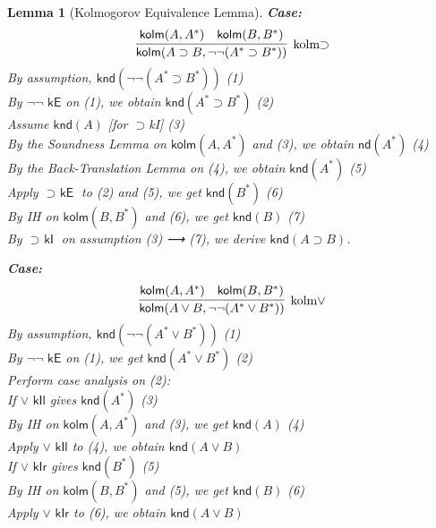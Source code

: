 \documentclass{article}
\newtheorem{lemma}{Lemma}
\begin{document}
\begin{lemma}[Kolmogorov Equivalence Lemma]
    \noindent \textbf{Case:} 
    \[
    \infer[\text{kolm$\supset$}]{\textsf{kolm}(A \supset B, \neg\neg (A^* \supset B^*))}{
      \textsf{kolm}(A, A^*) \quad \textsf{kolm}(B, B^*)
    }
    \]
    By assumption, $\textsf{knd}(\neg\neg (A^* \supset B^*))$ \hfill (1)\\
    By $\textsf{$\neg\neg$ kE}$ on (1), we obtain $\textsf{knd}(A^* \supset B^*)$ \hfill (2)\\
    Assume $\textsf{knd}(A)$ [for $\supset$kI] \hfill (3)\\
    By the Soundness Lemma on $\textsf{kolm}(A, A^*)$ and (3), we obtain $\textsf{nd}(A^*)$ \hfill (4)\\
    By the Back-Translation Lemma on (4), we obtain $\textsf{knd}(A^*)$ \hfill (5)\\
    Apply $\textsf{$\supset$ kE}$ to (2) and (5), we get $\textsf{knd}(B^*)$ \hfill (6)\\
    By IH on $\textsf{kolm}(B, B^*)$ and (6), we get $\textsf{knd}(B)$ \hfill (7)\\
    By $\textsf{$\supset$ kI}$ on assumption (3) ⟶ (7), we derive $\textsf{knd}(A \supset B)$.
    
    \medskip
    
    \noindent \textbf{Case:} 
    \[
    \infer[\text{kolm$\vee$}]{\textsf{kolm}(A \vee B, \neg\neg (A^* \vee B^*))}{
      \textsf{kolm}(A, A^*) \quad \textsf{kolm}(B, B^*)
    }
    \]
    By assumption, $\textsf{knd}(\neg\neg (A^* \vee B^*))$ \hfill (1)\\
    By $\textsf{$\neg\neg$ kE}$ on (1), we get $\textsf{knd}(A^* \vee B^*)$ \hfill (2)\\
    Perform case analysis on (2):\\
    \quad If $\textsf{$\vee$ kIl}$ gives $\textsf{knd}(A^*)$ \hfill (3)\\
    \quad \quad By IH on $\textsf{kolm}(A, A^*)$ and (3), we get $\textsf{knd}(A)$ \hfill (4)\\
    \quad \quad Apply $\textsf{$\vee$ kIl}$ to (4), we obtain $\textsf{knd}(A \vee B)$\\
    \quad If $\textsf{$\vee$ kIr}$ gives $\textsf{knd}(B^*)$ \hfill (5)\\
    \quad \quad By IH on $\textsf{kolm}(B, B^*)$ and (5), we get $\textsf{knd}(B)$ \hfill (6)\\
    \quad \quad Apply $\textsf{$\vee$ kIr}$ to (6), we obtain $\textsf{knd}(A \vee B)$
    
    \medskip
    

\end{lemma}
\end{document}
